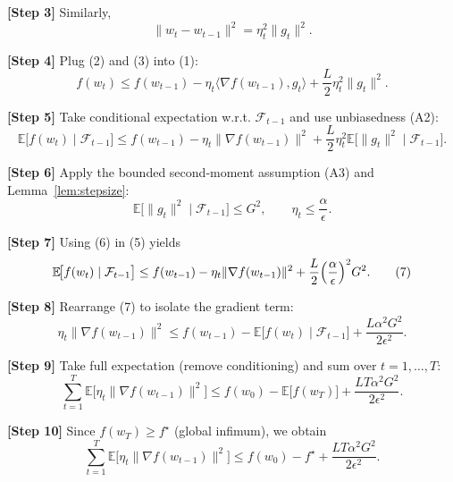 \documentclass{article}
\newcommand{\EE}{\mathbb{E}}
\begin{document}
\noindent\textbf{[Step 3]} Similarly,
\[
\|w_{t}-w_{t-1}\|^{2}= \eta_{t}^{2}\|g_{t}\|^{2}. \tag{3}
\]

\noindent\textbf{[Step 4]} Plug (2) and (3) into (1):
\[
f(w_{t})\le f(w_{t-1})-\eta_{t}\langle\nabla f(w_{t-1}),g_{t}\rangle
+\frac{L}{2}\eta_{t}^{2}\|g_{t}\|^{2}. \tag{4}
\]

\noindent\textbf{[Step 5]} Take conditional expectation w.r.t. $\mathcal{F}_{t-1}$ and use unbiasedness (A2):
\[
\EE\!\bigl[f(w_{t})\mid\mathcal{F}_{t-1}\bigr]
\le f(w_{t-1})-\eta_{t}\|\nabla f(w_{t-1})\|^{2}
+\frac{L}{2}\eta_{t}^{2}\EE\!\bigl[\|g_{t}\|^{2}\mid\mathcal{F}_{t-1}\bigr]. \tag{5}
\]

\noindent\textbf{[Step 6]} Apply the bounded second‑moment assumption (A3) and Lemma~\ref{lem:stepsize}:
\[
\EE\!\bigl[\|g_{t}\|^{2}\mid\mathcal{F}_{t-1}\bigr]\le G^{2},
\qquad 
\eta_{t}\le\frac{\alpha}{\epsilon}. \tag{6}
\]

\noindent\textbf{[Step 7]} Using (6) in (5) yields
\[
\EE\!\bigl[f(w_{t})\mid\mathcal{F}_{t-1}\bigr]
\le f(w_{t-1})-\eta_{t}\|\nabla f(w_{t-1})\|^{2}
+\frac{L}{2}\Bigl(\frac{\alpha}{\epsilon}\Bigr)^{2}G^{2}. \tag{7}
\]

\noindent\textbf{[Step 8]} Rearrange (7) to isolate the gradient term:
\[
\eta_{t}\|\nabla f(w_{t-1})\|^{2}
\le f(w_{t-1})-\EE\!\bigl[f(w_{t})\mid\mathcal{F}_{t-1}\bigr]
+\frac{L\alpha^{2}G^{2}}{2\epsilon^{2}}. \tag{8}
\]

\noindent\textbf{[Step 9]} Take full expectation (remove conditioning) and sum over $t=1,\dots,T$:
\[
\sum_{t=1}^{T}\EE\!\bigl[\eta_{t}\|\nabla f(w_{t-1})\|^{2}\bigr]
\le f(w_{0})- \EE\!\bigl[f(w_{T})\bigr]
+\frac{LT\alpha^{2}G^{2}}{2\epsilon^{2}}. \tag{9}
\]

\noindent\textbf{[Step 10]} Since $f(w_{T})\ge f^{\star}$ (global infimum), we obtain
\[
\sum_{t=1}^{T}\EE\!\bigl[\eta_{t}\|\nabla f(w_{t-1})\|^{2}\bigr]
\le f(w_{0})-f^{\star}
+\frac{LT\alpha^{2}G^{2}}{2\epsilon^{2}}. \tag{10}
\]
\end{document}
